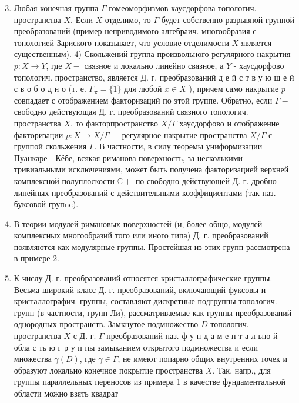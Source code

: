 \documentclass[10pt]{article}
\begin{document}
\begin{enumerate}

  \setcounter{enumi}{2}

  \item Любая конечная группа $\Gamma$ гомеоморфизмов хаусдорфова топологич. пространства $X$. Если $X$ отделимо, то $\Gamma$ будет собственно разрывной группой преобразований (пример неприводимого алгебраич. многообразия с топологией Зариского показывает, что условие отделимости $X$ является существенным). 4) Скольжений группа произвольного регулярного накрытия $p: X \rightarrow Y$, где $X-$ связное и локально линейно связное, а $Y$ - хаусдорфово топологич. пространство, является Д. г. преобразований д е й с т в у ю щ е й с в о б о д н о (т. е. $\Gamma_{\boldsymbol{x}}=\{1\}$ для любой $x \in X$ ), причем само накрытие $p$ совпадает с отображением факторизаций по этой группе. Обратно, если $\Gamma-$ свободно действующая Д. г. преобразований связного топологич. пространства $X$, то факторпространство $X / \Gamma$ хаусдорфово и отображение факторизации $p: X \rightarrow X / \Gamma-$ регулярное накрытие пространства $X / \Gamma$ с группой скольжения $\Gamma$. В частности, в силу теоремы униформизации Пуанкаре - Кёбе, всякая риманова поверхность, за несколькими тривиальными исключениями, может быть получена факторизацией верхней комплексной полуплоскости $\mathbb{C}+$ по свободно действующей Д. г. дробно-линейных преобразований с действительными коэффициентами (так наз. буксовой групne).



  \item В теории модулей римановых поверхностей (и, более общо, модулей комплексных многообразий того или иного типа) Д. г. преобразований появляются как модулярные группы. Простейшая из этих групп рассмотрена в примере 2.



  \item К числу Д. г. преобразований относятся кристаллографические группы. Весьма широкий класс Д. г. преобразований, включающий фуксовы и кристаллографич. группы, составляют дискретные подгруппы топологич. групп (в частности, групп Ли), рассматриваемые как группы преобразований однородных пространств. Замкнутое подмножество $D$ топологич. пространства $X$ с Д. г. $\Gamma$ преобразований наз. ф у н д а м е н т а л ьно й обла с ть ю г р у п пы замыканием открытого подмножества и если множества $\gamma(D)$, где $\gamma \in \Gamma$, не имеют попарно общих внутренних точек и образуют локально конечное покрытие пространства $X$. Так, напр., для группы параллельных переносов из примера 1 в качестве фундаментальной области можно взять квадрат



\end{enumerate}
\end{document}
